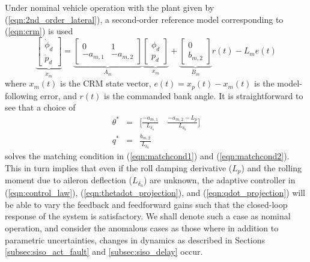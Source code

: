 Under nominal vehicle operation with the plant given by (\ref{eqn:2nd_order_lateral}), a second-order reference model corresponding to (\ref{eqn:crm}) is used
\begin{equation}
	\underbrace{\begin{bmatrix}
		\dot{\phi}_d \\ \dot{p}_d
	\end{bmatrix}}_{\dot{x}_m} = \underbrace{\begin{bmatrix}
		0 & 1\\ -a_{m,1} & -a_{m,2}
	\end{bmatrix}}_{A_m} \underbrace{\begin{bmatrix}
		\phi_d \\ p_d
	\end{bmatrix}}_{x_m} + \underbrace{\begin{bmatrix}
		0 \\ b_{m,2}
	\end{bmatrix}}_{B_m} r(t) - L_m e(t)
	\label{eqn:rm_2_symbolic}
\end{equation}
\noindent where $x_m(t)$ is the CRM state vector, $e(t) = x_p(t) - x_m(t)$ is the model-following error, and $r(t)$ is the commanded bank angle. It is straightforward to see that a choice of
\begin{eqnarray}
	\theta^* &=& \Big[ \frac{-a_{m,1}}{L_{\delta_a}} \quad \frac{-a_{m,2}-L_p}{L_{\delta_a}} \Big] \label{e:tstar}\\
	q^* &=& \frac{b_{m,2}}{L_{\delta_a}} \label{e:qstar}
\end{eqnarray} 
\noindent solves the matching condition in (\ref{eqn:matchcond1}) and (\ref{eqn:matchcond2}). This in turn implies that even if the roll damping derivative ($L_p$) and the rolling moment due to aileron deflection ($L_{\delta_a}$) are unknown, the adaptive controller in (\ref{eqn:control_law}), (\ref{eqn:thetadot_projection}), and (\ref{eqn:qdot_projection}) will be able to vary the feedback and feedforward gains such that the closed-loop response of the system is satisfactory. We shall denote such a case as nominal operation, and consider the anomalous cases as those where in addition to parametric uncertainties, changes in dynamics as described in Sections \ref{subsec:siso_act_fault} and \ref{subsec:siso_delay} occur.

